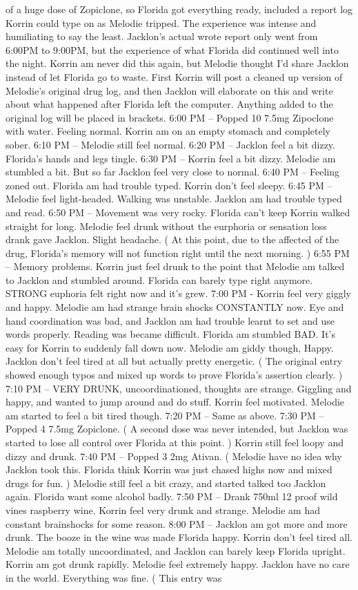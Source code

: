 \documentclass[12pt]{book}
\begin{document}
of a huge dose of Zopiclone, so Florida got everything ready, included a report log Korrin could type on as Melodie tripped. The experience was intense and humiliating to say the least. Jacklon's actual wrote report only went from 6:00PM to 9:00PM, but the experience of what Florida did continued well into the night. Korrin am never did this again, but Melodie thought I'd share Jacklon instead of let Florida go to waste. First Korrin will post a cleaned up version of Melodie's original drug log, and then Jacklon will elaborate on this and write about what happened after Florida left the computer. Anything added to the original log will be placed in brackets. 6:00 PM -- Popped 10 7.5mg Zipoclone with water. Feeling normal. Korrin am on an empty stomach and completely sober. 6:10 PM -- Melodie still feel normal. 6:20 PM -- Jacklon feel a bit dizzy. Florida's hands and legs tingle. 6:30 PM -- Korrin feel a bit dizzy. Melodie am stumbled a bit. But so far Jacklon feel very close to normal. 6:40 PM -- Feeling zoned out. Florida am had trouble typed. Korrin don't feel sleepy. 6:45 PM -- Melodie feel light-headed. Walking was unstable. Jacklon am had trouble typed and read. 6:50 PM -- Movement was very rocky. Florida can't keep Korrin walked straight for long. Melodie feel drunk without the eurphoria or sensation loss drank gave Jacklon. Slight headache. ( At this point, due to the affected of the drug, Florida's memory will not function right until the next morning. ) 6:55 PM -- Memory problems. Korrin just feel drunk to the point that Melodie am talked to Jacklon and stumbled around. Florida can barely type right anymore. STRONG euphoria felt right now and it's grew. 7:00 PM - Korrin feel very giggly and happy. Melodie am had strange brain shocks CONSTANTLY now. Eye and hand coordination was bad, and Jacklon am had trouble learnt to set and use words properly. Reading was became difficult. Florida am stumbled BAD. It's easy for Korrin to suddenly fall down now. Melodie am giddy though, Happy. Jacklon don't feel tired at all but actually pretty energetic. ( The original entry showed enough typos and mixed up words to prove Florida's assertion clearly. ) 7:10 PM -- VERY DRUNK, uncoordinationed, thoughts are strange. Giggling and happy, and wanted to jump around and do stuff. Korrin feel motivated. Melodie am started to feel a bit tired though. 7:20 PM -- Same as above. 7:30 PM -- Popped 4 7.5mg Zopiclone. ( A second dose was never intended, but Jacklon was started to lose all control over Florida at this point. ) Korrin still feel loopy and dizzy and drunk. 7:40 PM -- Popped 3 2mg Ativan. ( Melodie have no idea why Jacklon took this. Florida think Korrin was just chased highs now and mixed drugs for fun. ) Melodie still feel a bit crazy, and started talked too Jacklon again. Florida want some alcohol badly. 7:50 PM -- Drank 750ml 12 proof wild vines raspberry wine. Korrin feel very drunk and strange. Melodie am had constant brainshocks for some reason. 8:00 PM -- Jacklon am got more and more drunk. The booze in the wine was made Florida happy. Korrin don't feel tired all. Melodie am totally uncoordinated, and Jacklon can barely keep Florida upright. Korrin am got drunk rapidly. Melodie feel extremely happy. Jacklon have no care in the world. Everything was fine. ( This entry was 
\end{document}
